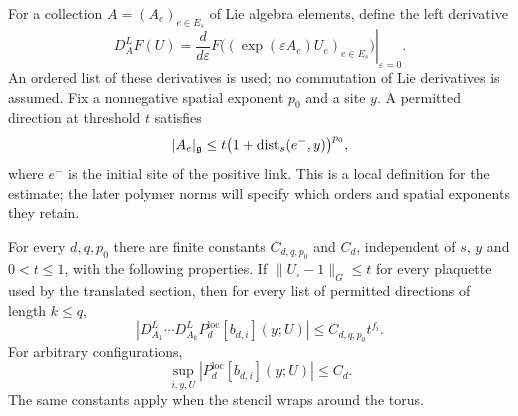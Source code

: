 For a collection $A=(A_e)_{e\in E_s}$ of Lie algebra elements, define the
left derivative
\[
 D_A^L F(U)=\left.\frac{d}{d\varepsilon}
       F\bigl((\exp(\varepsilon A_e)U_e)_{e\in E_s}\bigr)
          \right|_{\varepsilon=0}.
\]
An ordered list of these derivatives is used; no commutation of Lie
derivatives is assumed. Fix a nonnegative spatial exponent $p_0$ and a
site $y$. A permitted direction at threshold $t$ satisfies
\begin{equation}
 |A_e|_{\mathfrak g}\le t\bigl(1+\operatorname{dist}_s(e^-,y)\bigr)^{p_0},
 \label{ch02:direction}
\end{equation}
where $e^-$ is the initial site of the positive link. This is a local
definition for the estimate; the later polymer norms will specify which
orders and spatial exponents they retain.

\begin{proposition}
\label{ch02:section-bounds}
For every $d,q,p_0$ there are finite constants $C_{d,q,p_0}$ and $C_d$,
independent of $s$, $y$ and $0<t\le1$, with the following properties.
If $\|U_\square-1\|_G\le t$ for every plaquette used by the translated section,
then for every list of permitted directions of length $k\le q$,
\begin{equation}
 \left|D_{A_1}^L\cdots D_{A_k}^L
       P_d^{\mathrm{loc}}[b_{d,i}](y;U)\right|
       \le C_{d,q,p_0}t^{f_i}.
 \label{ch02:section-small-bound}
\end{equation}
For arbitrary configurations,
\begin{equation}
 \sup_{i,y,U}|P_d^{\mathrm{loc}}[b_{d,i}](y;U)|\le C_d.
 \label{ch02:section-global-bound}
\end{equation}
The same constants apply when the stencil wraps around the torus.
\end{proposition}
